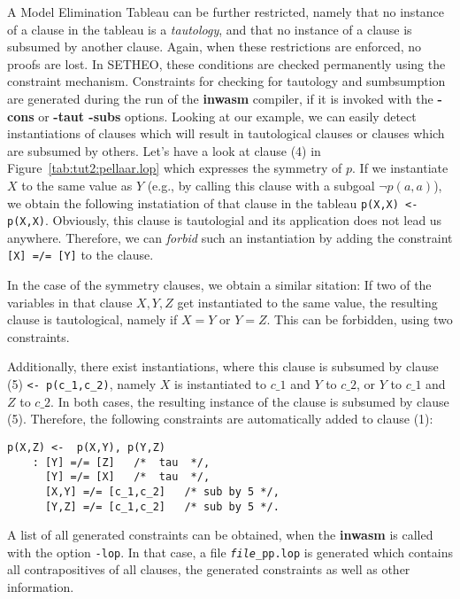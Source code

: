 A Model Elimination Tableau can be further restricted, namely that
no instance of a clause in the tableau is a {\em tautology\/}, and
that no instance of a clause is subsumed by another clause.
Again, when these restrictions are enforced, no proofs are lost.
In SETHEO, these conditions are checked permanently using
the constraint mechanism. Constraints for checking for tautology and
sumbsumption are generated during the run of the {\bf inwasm} compiler,
if it is invoked with the {\bf -cons} or {\bf -taut -subs} options.
Looking at our example, we can easily detect instantiations of clauses
which will result in tautological clauses or clauses which are subsumed
by others. Let's have a look at clause (4) in 
Figure~\ref{tab:tut2:pellaar.lop} which expresses the symmetry of $p$.
If we instantiate $X$ to the same value as $Y$ (e.g., by calling this
clause with a subgoal $\neg p(a,a)$), we obtain the following
instatiation of that clause in the tableau
{\tt p(X,X) <- p(X,X)}. Obviously, this clause is tautologial and
its application does not lead us anywhere. Therefore, we can {\em forbid\/}
such an instantiation by adding the constraint {\tt [X] =/= [Y]}
to the clause.

In the case of the symmetry clauses, we obtain a similar sitation:
If two of the variables in that clause $X,Y,Z$ get instantiated to the
same value, the resulting clause is tautological, namely if
$X = Y$ or $Y = Z$. This can be forbidden, using two constraints.

Additionally, there exist instantiations, where this clause is subsumed
by clause (5) {\verb+<- p(c_1,c_2)+}, namely $X$ is instantiated
to $c\_1$ and $Y$ to $c\_2$, or $Y$ to $c\_1$ and $Z$ to $c\_2$.
In both cases, the resulting instance of the clause is subsumed by
clause (5).
Therefore, the following constraints are automatically added to
clause (1):

\begin{center}
\begin{verbatim}
p(X,Z) <-  p(X,Y), p(Y,Z)
	: [Y] =/= [Z]	/*  tau  */, 
	  [Y] =/= [X]	/*  tau  */, 
	  [X,Y] =/= [c_1,c_2]	/* sub by 5 */, 
	  [Y,Z] =/= [c_1,c_2]	/* sub by 5 */.
\end{verbatim}
\end{center}

A list of all generated constraints can be obtained, when the {\bf inwasm}
is called with the option {\tt -lop}. In that case, a file 
{\tt {\em file}\_pp.lop} is generated which contains all contrapositives
of all clauses, the generated constraints as well as other information.

